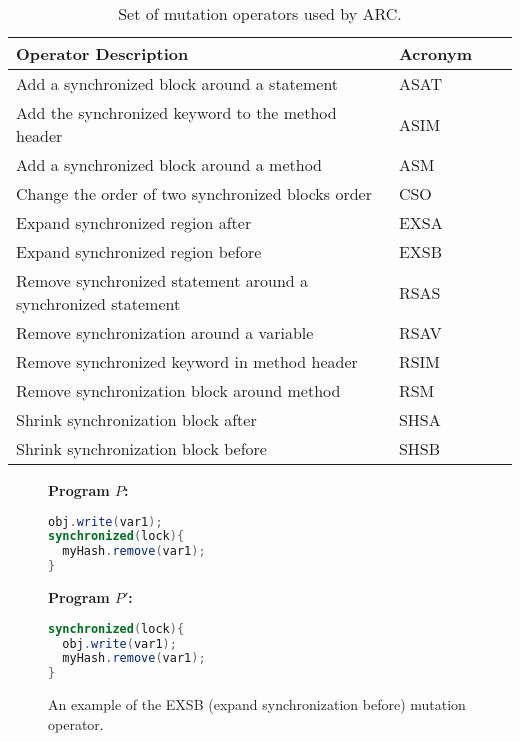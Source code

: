 \documentclass{llncs}
\begin{document}
\begin{table}[t!]
\caption{Set of mutation operators used by ARC.}
\begin{center}
\begin{tabular}{|l|l|c|c|}
\hline
\textbf{Operator Description} & \textbf{Acronym} \\
\hline
Add a synchronized block around a statement & ASAT \\
\hline
Add the synchronized keyword to the method header & ASIM \\
\hline
Add a synchronized block around a method & ASM  \\
\hline
Change the order of two synchronized blocks order & CSO  \\
\hline
Expand synchronized region after & EXSA  \\
\hline
Expand synchronized region before & EXSB  \\
\hline
Remove synchronized statement around a synchronized statement & RSAS  \\
\hline
Remove synchronization around a variable & RSAV  \\
\hline
Remove synchronized keyword in method header & RSIM  \\
\hline
Remove synchronization block around method & RSM  \\
\hline
Shrink synchronization block after & SHSA  \\
\hline
Shrink synchronization block before & SHSB  \\
\hline
\end{tabular}
\label{tbl:Operators}
\end{center}
\end{table}

\begin{figure}[t!]
\vspace{2mm}
\begin{minipage}{5cm}
\footnotesize{\textbf{ Program $P$:}}
\begin{lstlisting}[language=Java, morekeywords={synchronize}]
obj.write(var1);
synchronized(lock){
  myHash.remove(var1);
}
\end{lstlisting}
\end{minipage}\hfill
\begin{minipage}{5cm}
\footnotesize{\textbf{ Program $P'$:}}
\begin{lstlisting}[language=Java, morekeywords={synchronize}]
synchronized(lock){
  obj.write(var1);
  myHash.remove(var1);
}
\end{lstlisting}
\end{minipage}
\caption{An example of the EXSB (expand synchronization before) mutation operator.}
\label{fig:EXSB_example}
\end{figure}
\end{document}
